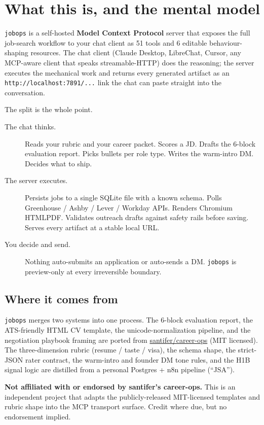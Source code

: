 \documentclass[11pt,letterpaper]{article}
\newcommand{\pkg}{\texttt{jobops}}
\begin{document}
\section{What this is, and the mental model}

\pkg{} is a self-hosted \textbf{Model Context Protocol} server that exposes the full job-search workflow to your chat client as 51 tools and 6 editable behaviour-shaping resources. The chat client (Claude Desktop, LibreChat, Cursor, any MCP-aware client that speaks streamable-HTTP) does the reasoning; the server executes the mechanical work and returns every generated artifact as an \texttt{http://localhost:7891/...} link the chat can paste straight into the conversation.

The split is the whole point.

\begin{description}
\item[The chat thinks.] Reads your rubric and your career packet. Scores a JD. Drafts the 6-block evaluation report. Picks bullets per role type. Writes the warm-intro DM. Decides what to ship.
\item[The server executes.] Persists jobs to a single SQLite file with a known schema. Polls Greenhouse / Ashby / Lever / Workday APIs. Renders Chromium HTML\textrightarrow{}PDF. Validates outreach drafts against safety rails before saving. Serves every artifact at a stable local URL.
\item[You decide and send.] Nothing auto-submits an application or auto-sends a DM. \pkg{} is preview-only at every irreversible boundary.
\end{description}

\subsection*{Where it comes from}

\pkg{} merges two systems into one process. The 6-block evaluation report, the ATS-friendly HTML CV template, the unicode-normalization pipeline, and the negotiation playbook framing are ported from \href{https://github.com/santifer/career-ops}{santifer/career-ops} (MIT licensed). The three-dimension rubric (resume / taste / visa), the schema shape, the strict-JSON rater contract, the warm-intro and founder DM tone rules, and the H1B signal logic are distilled from a personal Postgres + n8n pipeline (``JSA'').

\begin{notebox}
\textbf{Not affiliated with or endorsed by santifer's career-ops.} This is an independent project that adapts the publicly-released MIT-licensed templates and rubric shape into the MCP transport surface. Credit where due, but no endorsement implied.
\end{notebox}
\end{document}
